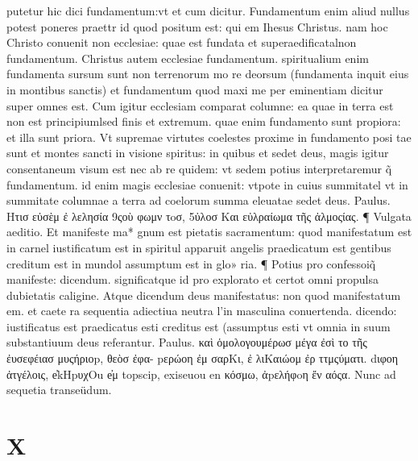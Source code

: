 \documentclass{article}
\begin{document}
\begin{pages}
putetur hic dici fundamentum:vt et cum dicitur. Fundamentum enim aliud nullus potest poneres praettr id quod positum est: qui em Ihesus Christus. nam hoc Christo conuenit non ecclesiae: quae est fundata et superaedificatalnon fundamentum. Christus autem ecclesiae fundamentum. spiritualium enim fundamenta sursum sunt non terrenorum mo re deorsum (fundamenta inquit eius in montibus sanctis) et fundamentum quod maxi me per eminentiam dicitur super omnes est. Cum igitur ecclesiam comparat columne: ea quae in terra est non est principiumlsed finis et extremum. quae enim fundamento sunt propiora: et illa sunt priora. Vt supremae virtutes coelestes proxime in fundamento posi tae sunt et montes sancti in visione spiritus: in quibus et sedet deus, magis igitur consentaneum visum est nec ab re quidem: vt sedem potius interpretaremur q̃ fundamentum. id enim magis ecclesiae conuenit: vtpote in cuius summitatel vt in summitate columnae a terra ad coelorum summa eleuatae sedet deus. Paulus. Hτισ εὐσὲμ ἐ λελησία 9ςοὺ φωμν  τoσ, 5ὐλοσ Και εὐλραίωμα τῆς ἀλμοςίας. ¶ Vulgata aeditio. Et manifeste ma* gnum est pietatis sacramentum: quod manifestatum est in carnel iustificatum est in spiritul  apparuit angelis praedicatum est gentibus creditum est in mundol assumptum est in glo» ria. ¶ Potius pro confessoiq̃ manifeste: dicendum. significatque id pro explorato et certot omni propulsa dubietatis caligine. Atque dicendum deus manifestatus: non quod manifestatum em. et caete ra sequentia adiectiua neutra l’in masculina conuertenda. dicendo: iustificatus est praedicatus esti creditus est (assumptus esti vt omnia in suum substantiuum deus referantur. Paulus. καὶ ὁμολογουμέρωσ μέγα ἐσὶ το τῆς ἐυσεφέιασ μυςήριοp, θεὸσ ἐφα- pερώοη ἐμ σαρΚι, ἐ λιΚαιώομ ἐρ ττμςύματι. dιφοη ἀτγέλοις, e̓kHpυχOu e̓μ topscip, exiseuou en κόσμω, ἀpελήφoη ἔν αόςα. Nunc ad sequetia transeüdum.  \pend
\section*{X }

\end{pages}
\end{document}
